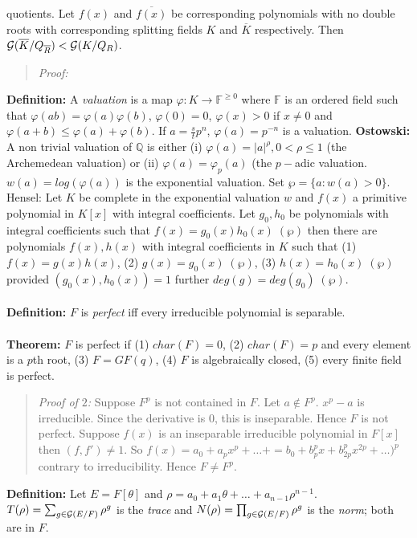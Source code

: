 quotients.  Let $f(x)$ and ${\overline {f(x)}}$ be corresponding polynomials
with no double roots with corresponding splitting fields $K$ and ${\overline K}$
respectively.  Then 
${\cal G}({\overline K}/Q_{\overline R})< {\cal G}(K/Q_R)$.
\begin{quote}
\emph{Proof:}
\end{quote}
{\bf Definition:}
A \emph{valuation} is a map $\varphi: K \rightarrow {\mathbb F}^{\ge 0}$ 
where ${\mathbb F}$ is an
ordered field such that $\varphi(ab)= 
\varphi(a) \varphi(b)$, $\varphi(0)=0$, $\varphi(x)>0$ if $x \ne 0$ and 
$\varphi(a+b) \le
\varphi(a) + \varphi(b)$.  If $a= {\frac s t} p^n$, $\varphi(a)= p^{-n}$ is a valuation.
{\bf Ostowski:} A non trivial valuation of ${\mathbb Q}$ is either 
(i) $\varphi(a)= |a|^\rho, 0 < \rho \le 1$ (the Archemedean valuation) or (ii)
$\varphi(a)= \varphi_p(a)$ (the $p-$adic valuation.  $w(a)= log(\varphi(a))$ is the 
exponential valuation.  Set $\wp= \{a: w(a) >0 \}$.  Hensel:  Let $K$ be complete
in the exponential valuation $w$ and $f(x)$ a primitive polynomial in $K[x]$ with integral
coefficients. Let $g_0 , h_0$ be polynomials with integral coefficients such that
$f(x)= g_0(x) h_0(x) \; (\wp)$ then there are polynomials $f(x), h(x)$ with integral
coefficients in $K$ such that (1) $f(x)=g(x)h(x)$, 
(2) $g(x)= g_0(x) \; (\wp)$,
(3) $h(x)= h_0(x) \; (\wp)$ provided $(g_0(x), h_0(x))=1$ 
further $deg(g)= deg(g_0) \; (\wp)$.
\\
\\
{\bf Definition:}
$F$ is \emph{perfect} iff every irreducible polynomial is separable.
\\
\\
{\bf Theorem:} $F$ is perfect if
(1) $char(F)=0$, (2) $char(F)=p$ and every element is a $p$th root,
(3) $F= GF(q)$, (4) $F$ is algebraically closed, (5) every finite field is perfect.
\begin{quote}
\emph{Proof of $2$:}  Suppose $F^p$ is not contained in $F$.  Let $a \notin F^p$.
$x^p-a$ is irreducible.  Since the derivative is $0$, this is inseparable.  Hence
$F$ is not perfect.  Suppose $f(x)$ is an inseparable irreducible polynomial in
$F[x]$ then $(f,f') \ne 1$.  So $f(x)= a_0 +a_p x^p + \ldots + =
b_0 + b_p^px + b_{2p}^p x^{2p} + \ldots)^p$ contrary to irreducibility.
Hence $F \ne F^p$.
\end{quote}
{\bf Definition:}
Let $E=F[\theta]$ and $\rho= a_0 + a_1 \theta + \ldots + a_{n-1} \rho^{n-1}$. 
$T(\rho)= \sum_{g \in {\cal G}(E/F)} \rho^g$ is the \emph{trace} and
$N(\rho)= \prod_{g \in {\cal G}(E/F)} \rho^g$ is the \emph{norm}; both are in $F$.
